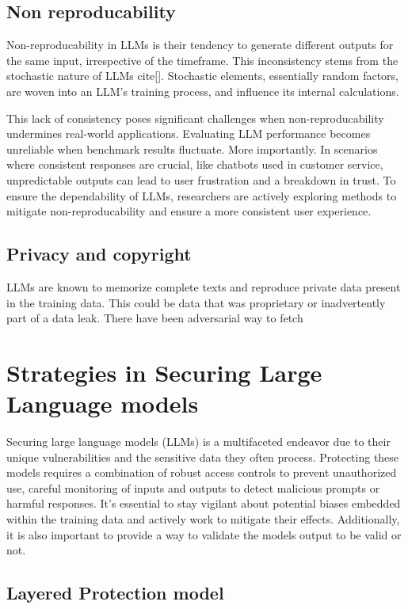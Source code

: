 \documentclass[11pt]{article}
\begin{document}
\subsection{ Non reproducability }

Non-reproducability in LLMs is their tendency to generate different outputs for the same input, irrespective of the timeframe. This inconsistency stems from the stochastic nature of LLMs cite[]. Stochastic elements, essentially random factors, are woven into an LLM's training process, and influence its internal calculations. 

This lack of consistency poses significant challenges when non-reproducability undermines real-world applications. Evaluating LLM performance becomes unreliable when benchmark results fluctuate. More importantly. In scenarios where consistent responses are crucial, like chatbots used in customer service, unpredictable outputs can lead to user frustration and a breakdown in trust. To ensure the dependability of LLMs, researchers are actively exploring methods to mitigate non-reproducability and ensure a more consistent user experience.

\subsection{ Privacy and copyright }

LLMs are known to memorize complete texts and reproduce private data present in the training data. This could be data that was proprietary or inadvertently part of a data leak. There have been adversarial way to fetch


\section{ Strategies in Securing Large Language models }

Securing large language models (LLMs) is a multifaceted endeavor due to their unique vulnerabilities and the sensitive data they often process.  Protecting these models requires a combination of robust access controls to prevent unauthorized use, careful monitoring of inputs and outputs to detect malicious prompts or harmful responses. It's essential to stay vigilant about potential biases embedded within the training data and actively work to mitigate their effects.  Additionally, it is also important to provide a way to validate the models output to be valid or not.


\subsection{ Layered Protection model }
\end{document}
